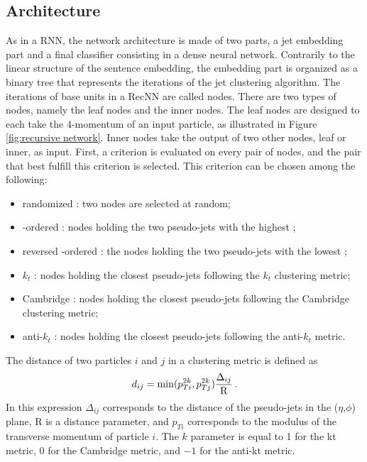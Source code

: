 \subsection{Architecture}

As in a RNN, the network architecture is made of two parts, a jet embedding part and a final classifier consisting in a dense neural network. Contrarily to the linear structure of the sentence embedding, the embedding part is organized as a binary tree that represents the iterations of the jet clustering algorithm. The iterations of base units in a RecNN are called nodes. There are two types of nodes, namely the leaf nodes and the inner nodes. The leaf nodes are designed to each take the 4-momentum of an input particle, as illustrated in Figure \ref{fig:recursive network}. Inner nodes take the output of two other nodes, leaf or inner, as input. First, a criterion is evaluated on every pair of nodes, and the pair that best fulfill this criterion is selected. This criterion can be chosen among the following:
    
\begin{itemize}
    \item randomized : two nodes are selected at random;
    \item \pt-ordered : nodes holding the two pseudo-jets with the highest \pt;
    \item reversed \pt-ordered : the nodes holding the two pseudo-jets with the lowest \pt;
    \item $k_t$ : nodes holding the closest pseudo-jets following the $k_t$ clustering metric;
    \item Cambridge : nodes holding the closest pseudo-jets following the Cambridge clustering metric;
    \item anti-$k_t$ : nodes holding the closest pseudo-jets following the anti-$k_t$ metric.
\end{itemize}
The distance of two particles $i$ and $j$ in a clustering metric is defined as
\begin{equation}
    d_{ij} = \mathrm{min}(p_{Ti}^{2k},p_{Tj}^{2k}) \frac{\Delta_{ij}}{\mathrm{R}} \mend
\end{equation}
In this expression $\Delta_{ij}$ corresponds to the distance of the pseudo-jets in the ($\eta$,$\phi$) plane, R is a distance parameter, and $p_{Ti}$ corresponds to the modulus of the transverse momentum of particle $i$. The $k$ parameter is equal to 1 for the kt metric, 0 for the Cambridge metric, and $-1$ for the anti-kt metric.

